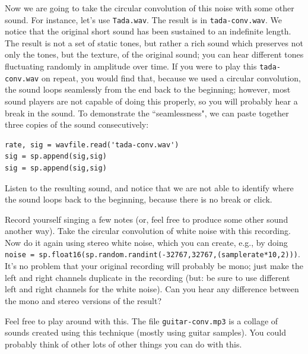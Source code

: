 Now we are going to take the circular convolution of this noise with some other sound. For instance, let's use \texttt{Tada.wav}. The result is in \texttt{tada-conv.wav}. We notice that the original short sound has been sustained to an indefinite length. The result is not a set of static tones, but rather a rich sound which preserves not only the tones, but the texture, of the original sound; you can hear different tones fluctuating randomly in amplitude over time. If you were to play this \texttt{tada-conv.wav} on repeat, you would find that, because we used a circular convolution, the sound loops seamlessly from the end back to the beginning; however, most sound players are not capable of doing this properly, so you will probably hear a break in the sound. To demonstrate the ``seamlessness", we can paste together three copies of the sound consecutively:

\begin{lstlisting}
rate, sig = wavfile.read('tada-conv.wav')
sig = sp.append(sig,sig)
sig = sp.append(sig,sig)
\end{lstlisting}

Listen to the resulting sound, and notice that we are not able to identify where the sound loops back to the beginning, because there is no break or click.

\begin{problem}
Record yourself singing a few notes (or, feel free to produce some other sound another way). Take the circular convolution of white noise with this recording. Now do it again using stereo white noise, which you can create, e.g., by doing \texttt{noise = sp.float16(sp.random.randint(-32767,32767,(samplerate*10,2)))}. It's no problem that your original recording will probably be mono; just make the left and right channels duplicate in the recording (but: be sure to use different left and right channels for the white noise). Can you hear any difference between the mono and stereo versions of the result?
\end{problem}

Feel free to play around with this. The file \texttt{guitar-conv.mp3} is a collage of sounds created using this technique (mostly using guitar samples). You could probably think of other lots of other things you can do with this.


